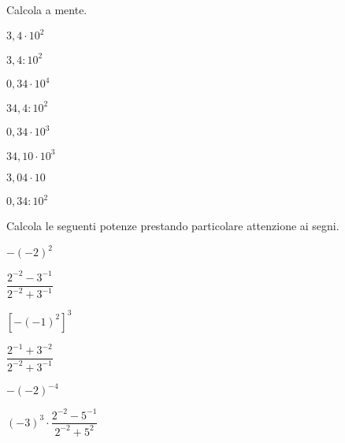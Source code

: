 \begin{esercizio}
\label{ese:3.59}
Calcola a mente.

\begin{htmulticols}{4}
\begin{enumeratees}
 \item \(3,4\cdot10^2\)
 \item \(3,4:10^2\)
 \item \(0,34\cdot10^4\)
 \item \(34,4:10^2\)
 \item \(0,34\cdot10^3\)
 \item \(34,10\cdot10^3\)
 \item \(3,04\cdot10\)
 \item \(0,34:10^2\)
\end{enumeratees}
\end{htmulticols}
\end{esercizio}

\begin{esercizio}
\label{ese:3.60}
Calcola le seguenti potenze prestando particolare attenzione ai segni.

\begin{htmulticols}{3}
\begin{enumeratees}
 \spazielenx
 \item \(-(-2)^2\)
 \item \(\dfrac{2^{-2}-3^{-1}}{2^{-2}+3^{-1}}\)
 \item \([-(-1)^{2}]^3\)
 \item \(\dfrac{2^{-1}+3^{-2}}{2^{-2}+3^{-1}}\)
 \item \(-(-2)^{-4}\)
 \item \((-3)^3\cdot\dfrac{2^{-2}-5^{-1}}{2^{-2}+5^2}\)
\end{enumeratees}
\end{htmulticols}
\end{esercizio}

\subsubsection*{}

